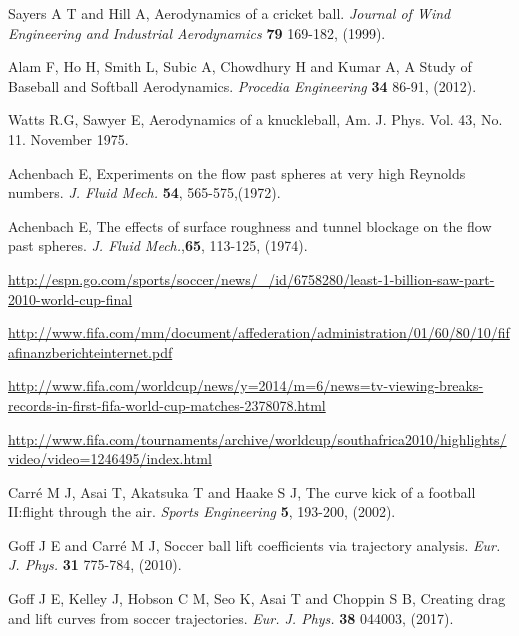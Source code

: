 \documentclass[a4paper]{article}
\begin{document}
\begin{thebibliography}{99}
	Sayers A T and Hill A, Aerodynamics of a cricket ball. \textit{Journal of Wind Engineering and Industrial Aerodynamics} \textbf{79} 169-182, (1999).

	Alam F, Ho H, Smith L, Subic A, Chowdhury H and Kumar A, A Study of Baseball and Softball Aerodynamics. \textit{Procedia Engineering} \textbf{34} 86-91, (2012).

Watts R.G, Sawyer E, Aerodynamics of a knuckleball, Am. J. Phys. Vol. 43, No. 11.  November 1975.

	Achenbach E, Experiments on the flow past spheres at very high Reynolds numbers. \textit{J. Fluid Mech.} 				\textbf{54}, 565-575,(1972).
	
	Achenbach E, The effects of surface roughness and tunnel blockage on the flow past spheres.  \textit{J. Fluid 			Mech.},\textbf{65}, 113-125, (1974).

	\url{http://espn.go.com/sports/soccer/news/_/id/6758280/least-1-billion-saw-part-2010-world-cup-final}

\url{http://www.fifa.com/mm/document/affederation/administration/01/60/80/10/fifafinanzberichteinternet.pdf}

\url{http://www.fifa.com/worldcup/news/y=2014/m=6/news=tv-viewing-breaks-records-in-first-fifa-world-cup-matches-2378078.html}

\url{http://www.fifa.com/tournaments/archive/worldcup/southafrica2010/highlights/video/video=1246495/index.html}

	Carr\'e M J, Asai T, Akatsuka T and Haake S J, The curve kick of a football II:flight through the air.	\textit{Sports Engineering} \textbf{5}, 193-200, (2002).

	Goff J E and Carr\'e M J, Soccer ball lift coefficients via trajectory analysis. \textit{Eur. J. Phys.} \textbf{31} 775-784, (2010).

	Goff J E, Kelley J, Hobson C M, Seo K, Asai T and Choppin S B, Creating drag and lift curves from soccer trajectories. \textit{Eur. J. Phys.} \textbf{38} 044003, (2017).



\end{thebibliography}
\end{document}
